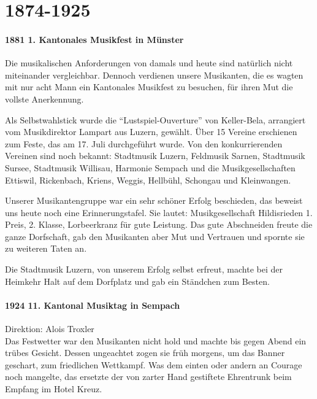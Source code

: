 \chapter{1874-1925}

\begin{history}

    \subsubsection*{1881 1. Kantonales Musikfest in Münster}

    Die musikalischen Anforderungen von damals und heute sind natürlich nicht
    miteinander vergleichbar. Dennoch verdienen unsere Musikanten, die es wagten
    mit nur acht Mann ein Kantonales Musikfest zu besuchen, für ihren Mut die
    vollste Anerkennung.

    Als Selbstwahlstick wurde die \enquote{Lustspiel-Ouverture} von Keller-Bela,
    arrangiert vom Musikdirektor Lampart aus Luzern, gewählt. Über 15 Vereine
    erschienen zum Feste, das am 17. Juli durchgeführt wurde. Von den
    konkurrierenden Vereinen sind noch bekannt: Stadtmusik Luzern, Feldmusik
    Sarnen, Stadtmusik Sursee, Stadtmusik Willisau, Harmonie Sempach und die
    Musikgesellschaften Ettiswil, Rickenbach, Kriens, Weggis, Hellbühl, Schongau
    und Kleinwangen.

    Unserer Musikantengruppe war ein sehr schöner Erfolg beschieden, das beweist
    uns heute noch eine Erinnerungstafel. Sie lautet: Musikgesellschaft
    Hildisrieden 1. Preis, 2. Klasse, Lorbeerkranz für gute Leistung. Das gute
    Abschneiden freute die ganze Dorfschaft, gab den Musikanten aber Mut und
    Vertrauen und spornte sie zu weiteren Taten an.

    Die Stadtmusik Luzern, von unserem Erfolg selbst erfreut, machte bei der
    Heimkehr Halt auf dem Dorfplatz und gab ein Ständchen zum Besten.

    \subsubsection*{1924 11. Kantonal Musiktag in Sempach}

    Direktion: Alois Troxler\\
    Das Festwetter war den Musikanten nicht hold und machte bis gegen Abend ein
    trübes Gesicht. Dessen ungeachtet zogen sie früh morgens, um das Banner
    geschart, zum friedlichen Wettkampf. Was dem einten oder andern an Courage
    noch mangelte, das ersetzte der von zarter Hand gestiftete Ehrentrunk beim
    Empfang im Hotel Kreuz.


\end{history}
